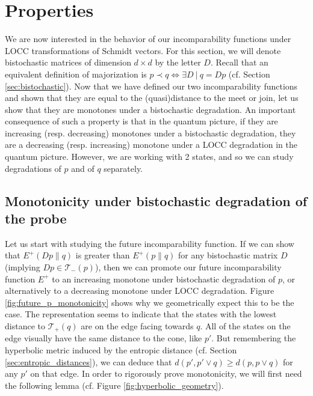 \section{Properties}

We are now interested in the behavior of our incomparability functions under LOCC transformations of Schmidt vectors. For this section, we will denote bistochastic matrices of dimension $d \times d$ by the letter $D$. Recall that an equivalent definition of majorization is $p \prec q \iff \exists D \: | \: q = Dp$ (cf. Section \ref{sec:bistochastic}). Now that we have defined our two incomparability functions and shown that they are equal to the (quasi)distance to the meet or join, let us show that they are monotones under a bistochastic degradation. An important consequence of such a property is that in the quantum picture, if they are increasing (resp. decreasing) monotones under a bistochastic degradation, they are a decreasing (resp. increasing) monotone under a LOCC degradation in the quantum picture. However, we are working with 2 states, and so we can study degradations of $p$ and of $q$ separately.



\subsection{Monotonicity under bistochastic degradation of the probe} \label{sec:p_monotonicity}

Let us start with studying the future incomparability function. If we can show that $E^+(Dp \parallel q)$ is greater than $E^+(p \parallel q)$ for any bistochastic matrix $D$ (implying $Dp \in \mathcal{T}_-(p)$), then we can promote our future incomparability function $E^+$ to an increasing monotone under bistochastic degradation of $p$, or alternatively to a decreasing monotone under LOCC degradation. Figure \ref{fig:future_p_monotonicity} shows why we geometrically expect this to be the case. The representation seems to indicate that the states with the lowest distance to $\mathcal{T}_+(q)$ are on the edge facing towards $q$. All of the states on the edge visually have the same distance to the cone, like $p'$. But remembering the hyperbolic metric induced by the entropic distance (cf. Section \ref{sec:entropic_distances}), we can deduce that $d(p', p' \vee q) \geq d(p, p \vee q)$ for any $p'$ on that edge. In order to rigorously prove monotonicity, we will first need the following lemma (cf. Figure \ref{fig:hyperbolic_geometry}).

